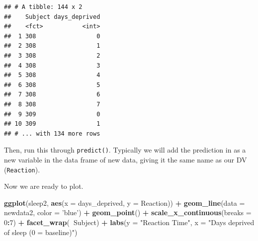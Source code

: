 \documentclass[]{book}
\newenvironment{Shaded}{\begin{snugshade}}{\end{snugshade}}
\newcommand{\DataTypeTok}[1]{\textcolor[rgb]{0.13,0.29,0.53}{#1}}
\newcommand{\DecValTok}[1]{\textcolor[rgb]{0.00,0.00,0.81}{#1}}
\newcommand{\KeywordTok}[1]{\textcolor[rgb]{0.13,0.29,0.53}{\textbf{#1}}}
\newcommand{\NormalTok}[1]{#1}
\newcommand{\OperatorTok}[1]{\textcolor[rgb]{0.81,0.36,0.00}{\textbf{#1}}}
\newcommand{\StringTok}[1]{\textcolor[rgb]{0.31,0.60,0.02}{#1}}
\begin{document}
\begin{Shaded}
\end{Shaded}

\begin{verbatim}
## # A tibble: 144 x 2
##    Subject days_deprived
##    <fct>           <int>
##  1 308                 0
##  2 308                 1
##  3 308                 2
##  4 308                 3
##  5 308                 4
##  6 308                 5
##  7 308                 6
##  8 308                 7
##  9 309                 0
## 10 309                 1
## # ... with 134 more rows
\end{verbatim}

Then, run this through \texttt{predict()}. Typically we will add the prediction in as a new variable in the data frame of new data, giving it the same name as our DV (\texttt{Reaction}).

\begin{Shaded}
\end{Shaded}

Now we are ready to plot.

\begin{Shaded}
\begin{Highlighting}[]
\KeywordTok{ggplot}\NormalTok{(sleep2, }\KeywordTok{aes}\NormalTok{(}\DataTypeTok{x =}\NormalTok{ days_deprived, }\DataTypeTok{y =}\NormalTok{ Reaction)) }\OperatorTok{+}
\StringTok{  }\KeywordTok{geom_line}\NormalTok{(}\DataTypeTok{data =}\NormalTok{ newdata2,}
            \DataTypeTok{color =} \StringTok{'blue'}\NormalTok{) }\OperatorTok{+}
\StringTok{  }\KeywordTok{geom_point}\NormalTok{() }\OperatorTok{+}
\StringTok{  }\KeywordTok{scale_x_continuous}\NormalTok{(}\DataTypeTok{breaks =} \DecValTok{0}\OperatorTok{:}\DecValTok{7}\NormalTok{) }\OperatorTok{+}
\StringTok{  }\KeywordTok{facet_wrap}\NormalTok{(}\OperatorTok{~}\NormalTok{Subject) }\OperatorTok{+}
\StringTok{  }\KeywordTok{labs}\NormalTok{(}\DataTypeTok{y =} \StringTok{"Reaction Time"}\NormalTok{, }\DataTypeTok{x =} \StringTok{"Days deprived of sleep (0 = baseline)"}\NormalTok{)}
\end{Highlighting}
\end{Shaded}
\end{document}

